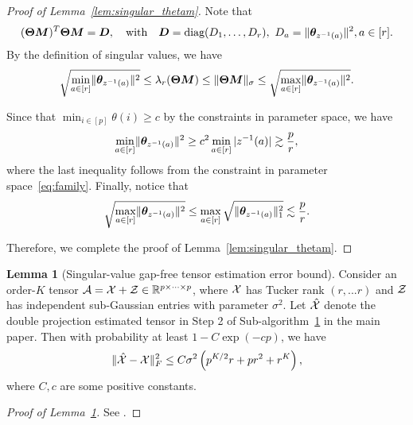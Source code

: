 \documentclass[lettersize,onecolumn,journal]{IEEEtran}
\theoremstyle{definition}
\newtheorem{lem}{Lemma}
\theoremstyle{definition}
\newcommand{\of}[1]{\left(#1\right)}
\begin{document}
\begin{proof}[Proof of Lemma~\ref{lem:singular_thetam}] Note that 
\begin{equation}
    (\boldsymbol{\Theta}\bm M)^T \boldsymbol{\Theta} \bm M = \bm{D}, \quad \text{with} \quad \bm{D} = \text{diag}(D_1,\ldots, D_r), \ D_a = \lVert\boldsymbol{\theta}_{z^{-1}(a)}\rVert^2, a \in [r].
\end{equation}
By the definition of singular values, we have 
\begin{equation}
     \sqrt{\min_{a \in [r]}\lVert \boldsymbol{\theta}_{ z^{-1}(a)} \rVert^2 } \leq \lambda_r(\boldsymbol{\Theta} \bm M) \leq \lVert\boldsymbol{\Theta}\bm M\rVert_{\sigma} \leq \sqrt{ \max_{a \in [r]}\lVert \boldsymbol{\theta}_{ z^{-1}(a)} \rVert^2}.
\end{equation}

Since that $\min_{i \in [p]}\theta(i) \geq c$ by the constraints in parameter space, we have  
\begin{equation}
   \min_{a \in [r]} \lVert \boldsymbol{\theta}_{ z^{-1}(a)} \rVert^2 \geq c^2 \min_{a \in [r]} |z^{-1}(a)| \gtrsim \frac{p}{r},
\end{equation}
where the last inequality follows from the constraint in parameter space~\eqref{eq:family}. Finally, notice that 
\begin{equation}
    \sqrt{\max_{a \in [r]}\lVert \boldsymbol{\theta}_{ z^{-1}(a)} \rVert^2 } \leq \max_{a \in [r]} \sqrt{ \lVert \boldsymbol{\theta}_{ z^{-1}(a)} \rVert^2_1} \lesssim \frac{p}{r}.
\end{equation}

 Therefore, we complete the proof of Lemma~\ref{lem:singular_thetam}.
\end{proof}


\begin{lem}[Singular-value gap-free tensor estimation error bound]\label{lem:two-step_esterror}Consider an order-$K$ tensor $\mathcal{A} = \mathcal{X} + \mathcal{Z} \in \mathbb{R}^{p \times \cdots \times p}$, where $\mathcal{X}$ has Tucker rank $(r,...r)$ and $\mathcal{Z}$ has independent sub-Gaussian entries with parameter $\sigma^2$. Let $\hat {\mathcal{X}}$ denote the double projection estimated tensor in Step 2 of Sub-algorithm~\hyperref[alg:main]{1} in the main paper. Then with probability at least $1 - C \exp\of{- cp }$, we have
\begin{align}
    \onormSize{}{\hat \tX - \tX}_F^2 \leq C \sigma^2 \of{ p^{K/2}r + pr^2 + r^K },
\end{align}
where $C, c$ are some positive constants.
\end{lem}

\begin{proof}[Proof of Lemma~\ref{lem:two-step_esterror}]
See \citet[Proposition 1]{han2020exact}.
\end{proof}
\end{document}
